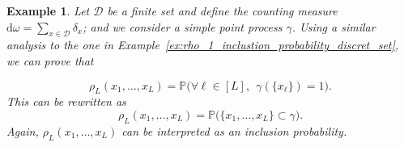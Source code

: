 \documentclass[twoside,11pt]{book}
\newtheorem{example}{Example}
\numberwithin{theorem}{chapter}
\numberwithin{definition}{chapter}
\numberwithin{proposition}{chapter}
\numberwithin{corollary}{chapter}
\numberwithin{example}{chapter}
\numberwithin{lemma}{chapter}
\numberwithin{assumption}{chapter}
\numberwithin{equation}{chapter}
\numberwithin{figure}{chapter}
\begin{document}
\begin{example}\label{ex:rho_L_inclustion_probability_discret_set}
Let $\mathcal{D}$ be a finite set and define the counting measure $\mathrm{d}\omega = \sum\limits_{x \in \mathcal{D}} \delta_x$; and we consider a simple point process $\gamma$. Using a similar analysis to the one in Example~\ref{ex:rho_1_inclustion_probability_discret_set}, we can prove that

\begin{equation}
\rho_{L}(x_{1}, \dots, x_{L}) = \mathbb{P} \big(\forall \ell \in [L], \:\: \gamma(\{x_\ell\}) = 1 \big).
\end{equation}
This can be rewritten as
\begin{equation}
\rho_{L}(x_{1}, \dots, x_{L}) = \mathbb{P} \big(\{x_{1}, \dots, x_{L} \} \subset \gamma \big).
\end{equation}
Again, $\rho_{L}(x_{1}, \dots, x_{L})$ can be interpreted as an inclusion probability.
\end{example}
\end{document}
